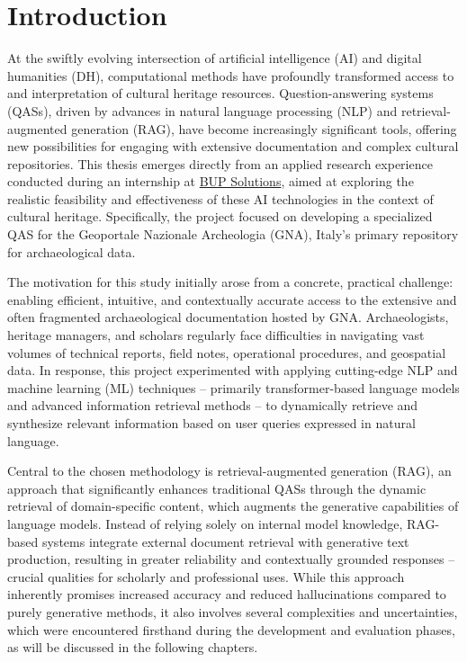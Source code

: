 \chapter{Introduction}
\label{chap:introduction}
\begin{spacing}{1.5}  %
At the swiftly evolving intersection of artificial intelligence (AI) and digital humanities (DH), computational methods have profoundly transformed access to and interpretation of cultural heritage resources. Question-answering systems (QASs), driven by advances in natural language processing (NLP) and retrieval-augmented generation (RAG), have become increasingly significant tools, offering new possibilities for engaging with extensive documentation and complex cultural repositories. This thesis emerges directly from an applied research experience conducted during an internship at \href{https://www.bupsolutions.com/en/home_en/}{BUP Solutions}\nocite{bup_solutions_bup_nodate}, aimed at exploring the realistic feasibility and effectiveness of these AI technologies in the context of cultural heritage. Specifically, the project focused on developing a specialized QAS for the Geoportale Nazionale Archeologia (GNA), Italy’s primary repository for archaeological data.

The motivation for this study initially arose from a concrete, practical challenge: enabling efficient, intuitive, and contextually accurate access to the extensive and often fragmented archaeological documentation hosted by GNA. Archaeologists, heritage managers, and scholars regularly face difficulties in navigating vast volumes of technical reports, field notes, operational procedures, and geospatial data. In response, this project experimented with applying cutting-edge NLP and machine learning (ML) techniques -- primarily transformer-based language models and advanced information retrieval methods -- to dynamically retrieve and synthesize relevant information based on user queries expressed in natural language.

Central to the chosen methodology is retrieval-augmented generation (RAG), an approach that significantly enhances traditional QASs through the dynamic retrieval of domain-specific content, which augments the generative capabilities of language models. Instead of relying solely on internal model knowledge, RAG-based systems integrate external document retrieval with generative text production, resulting in greater reliability and contextually grounded responses -- crucial qualities for scholarly and professional uses. While this approach inherently promises increased accuracy and reduced hallucinations compared to purely generative methods, it also involves several complexities and uncertainties, which were encountered firsthand during the development and evaluation phases, as will be discussed in the following chapters.


\end{spacing}
